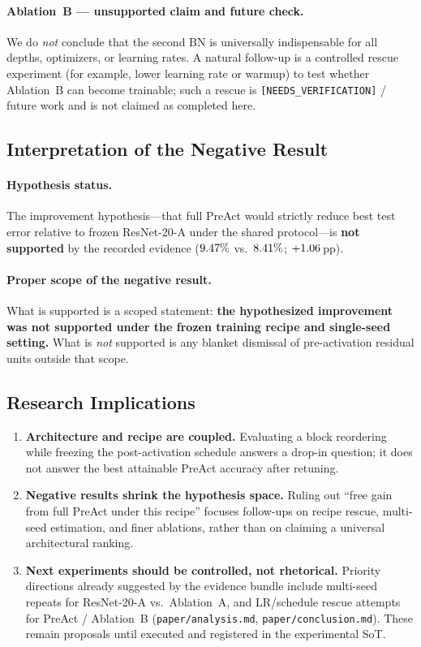 \paragraph{Ablation~B --- unsupported claim and future check.}
We do \emph{not} conclude that the second BN is universally indispensable for all depths,
optimizers, or learning rates.
A natural follow-up is a controlled rescue experiment (for example, lower learning rate or
warmup) to test whether Ablation~B can become trainable; such a rescue is
\texttt{[NEEDS\_VERIFICATION]} / future work and is not claimed as completed here.

\subsection{Interpretation of the Negative Result}
\label{sec:disc-negative}

\paragraph{Hypothesis status.}
The improvement hypothesis---that full PreAct would strictly reduce best test error relative
to frozen ResNet-20-A under the shared protocol---is \textbf{not supported} by the recorded
evidence ($9.47\%$ vs.\ $8.41\%$; $+1.06$\,pp).

\paragraph{Proper scope of the negative result.}
What is supported is a scoped statement:
\textbf{the hypothesized improvement was not supported under the frozen training recipe and
single-seed setting.}
What is \emph{not} supported is any blanket dismissal of pre-activation residual units
outside that scope.

\subsection{Research Implications}
\label{sec:disc-implications}

\begin{enumerate}
  \item \textbf{Architecture and recipe are coupled.}
  Evaluating a block reordering while freezing the post-activation schedule answers a
  drop-in question; it does not answer the best attainable PreAct accuracy after retuning.
  \item \textbf{Negative results shrink the hypothesis space.}
  Ruling out ``free gain from full PreAct under this recipe'' focuses follow-ups on
  recipe rescue, multi-seed estimation, and finer ablations, rather than on claiming a
  universal architectural ranking.
  \item \textbf{Next experiments should be controlled, not rhetorical.}
  Priority directions already suggested by the evidence bundle include multi-seed repeats
  for ResNet-20-A vs.\ Ablation~A, and LR/schedule rescue attempts for PreAct / Ablation~B
  (\texttt{paper/analysis.md}, \texttt{paper/conclusion.md}).
  These remain proposals until executed and registered in the experimental SoT.
\end{enumerate}
